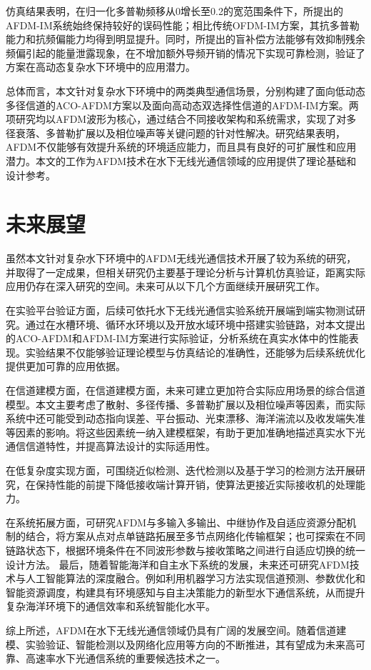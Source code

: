 仿真结果表明，在归一化多普勒频移从0增长至0.2的宽范围条件下，所提出的AFDM-IM系统始终保持较好的误码性能；相比传统OFDM-IM方案，其抗多普勒能力和抗频偏能力均得到明显提升。同时，所提出的盲补偿方法能够有效抑制残余频偏引起的能量泄露现象，在不增加额外导频开销的情况下实现可靠检测，验证了方案在高动态复杂水下环境中的应用潜力。

总体而言，本文针对复杂水下环境中的两类典型通信场景，分别构建了面向低动态多径信道的ACO-AFDM方案以及面向高动态双选择性信道的AFDM-IM方案。两项研究均以AFDM波形为核心，通过结合不同接收架构和系统需求，实现了对多径衰落、多普勒扩展以及相位噪声等关键问题的针对性解决。研究结果表明，AFDM不仅能够有效提升系统的环境适应能力，而且具有良好的可扩展性和应用潜力。本文的工作为AFDM技术在水下无线光通信领域的应用提供了理论基础和设计参考。

\section{未来展望}
\label{sec:future_work}

虽然本文针对复杂水下环境中的AFDM无线光通信技术开展了较为系统的研究，并取得了一定成果，但相关研究仍主要基于理论分析与计算机仿真验证，距离实际应用仍存在深入研究的空间。未来可从以下几个方面继续开展研究工作。

在实验平台验证方面，后续可依托水下无线光通信实验系统开展端到端实物测试研究。通过在水槽环境、循环水环境以及开放水域环境中搭建实验链路，对本文提出的ACO-AFDM和AFDM-IM方案进行实际验证，分析系统在真实水体中的性能表现。实验结果不仅能够验证理论模型与仿真结论的准确性，还能够为后续系统优化提供更加可靠的应用依据。

在信道建模方面，在信道建模方面，未来可建立更加符合实际应用场景的综合信道模型。本文主要考虑了散射、多径传播、多普勒扩展以及相位噪声等因素，而实际系统中还可能受到动态指向误差、平台振动、光束漂移、海洋湍流以及收发端失准等因素的影响。将这些因素统一纳入建模框架，有助于更加准确地描述真实水下光通信信道特性，并提高算法设计的实际适用性。

在低复杂度实现方面，可围绕近似检测、迭代检测以及基于学习的检测方法开展研究，在保持性能的前提下降低接收端计算开销，使算法更接近实际接收机的处理能力。

在系统拓展方面，可研究AFDM与多输入多输出、中继协作及自适应资源分配机制的结合，将方案从点对点单链路拓展至多节点网络化传输框架；也可探索在不同链路状态下，根据环境条件在不同波形参数与接收策略之间进行自适应切换的统一设计方法。
最后，随着智能海洋和自主水下系统的发展，未来还可研究AFDM技术与人工智能算法的深度融合。例如利用机器学习方法实现信道预测、参数优化和智能资源调度，构建具有环境感知与自主决策能力的新型水下通信系统，从而提升复杂海洋环境下的通信效率和系统智能化水平。

综上所述，AFDM在水下无线光通信领域仍具有广阔的发展空间。随着信道建模、实验验证、智能检测以及网络化应用等方向的不断推进，其有望成为未来高可靠、高速率水下光通信系统的重要候选技术之一。